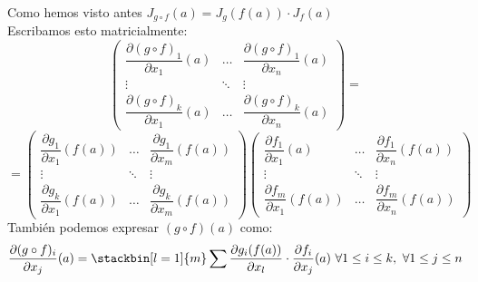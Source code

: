 	\begin{observacion}Como hemos visto antes $J_{g\circ f}(a)=J_g(f(a))\cdot J_f(a)$\\ Escribamos esto matricialmente:\\
	\[\begin{pmatrix} \dfrac{\partial (g\circ f)_1}{\partial x_1}(a) &\hdots&\dfrac{\partial (g\circ f)_1}{\partial x_n}(a)\\ \vdots & \ddots &\vdots\\ \dfrac{\partial (g\circ f)_k}{\partial x_1}(a) &\hdots & \dfrac{\partial (g\circ f)_k}{\partial x_n}(a)	\end{pmatrix}=\]\[=\begin{pmatrix}\dfrac{\partial g_1}{\partial x_1}(f(a))&\hdots & \dfrac{\partial g_1}{\partial x_m}(f(a))\\ \vdots & \ddots &\vdots\\\dfrac{\partial g_k}{\partial x_1}(f(a))&\hdots & \dfrac{\partial g_k}{\partial x_m}(f(a))	\end{pmatrix}\begin{pmatrix}\dfrac{\partial f_1}{\partial x_1}(a)&\hdots & \dfrac{\partial f_1}{\partial x_n}(f(a))\\ \vdots & \ddots &\vdots\\\dfrac{\partial f_m}{\partial x_1}(f(a))&\hdots & \dfrac{\partial f_m}{\partial x_n}(f(a))	\end{pmatrix}\]
	También podemos expresar $(g\circ f)(a)$ como:\\
	\[\dfrac{\partial(g\circ f)_i}{\partial x_j}(a)=\stackbin[l=1]{m}\sum \dfrac{\partial g_i(f(a))}{\partial x_l}\cdot\dfrac{\partial f_i}{\partial x_j}(a)\ \forall 1\leq i\leq k,\ \forall 1\leq j\leq n\]
	\end{observacion}
	
